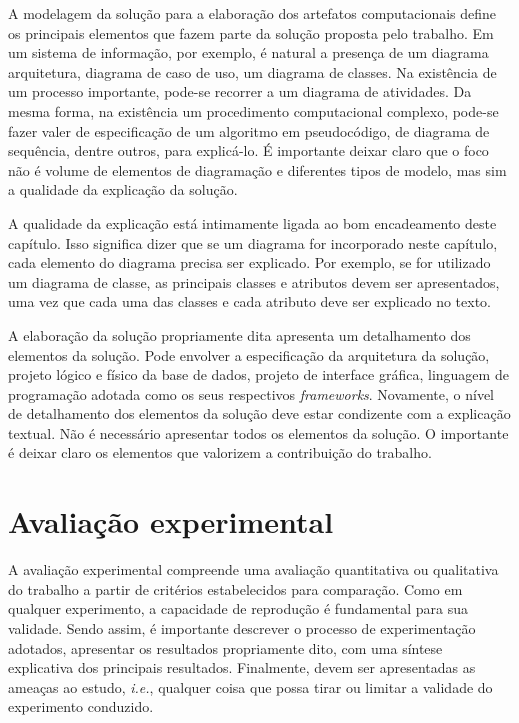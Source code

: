 \documentclass[12pt]{article}
\begin{document}
	A modelagem da solução para a elaboração dos artefatos computacionais define os principais elementos que fazem parte da solução proposta pelo trabalho. Em um sistema de informação, por exemplo, é natural a presença de um diagrama arquitetura, diagrama de caso de uso, um diagrama de classes. Na existência de um processo importante, pode-se recorrer a um diagrama de atividades. Da mesma forma, na existência um procedimento computacional complexo, pode-se fazer valer de especificação de um algoritmo em pseudocódigo, de diagrama de sequência, dentre outros, para explicá-lo. É importante deixar claro que o foco não é volume de elementos de diagramação e diferentes tipos de modelo, mas sim a qualidade da explicação da solução.
	
	A qualidade da explicação está intimamente ligada ao bom encadeamento deste capítulo. Isso significa dizer que se um diagrama for incorporado neste capítulo, cada elemento do diagrama precisa ser explicado. Por exemplo, se for utilizado um diagrama de classe, as principais classes e atributos devem ser apresentados, uma vez que cada uma das classes e cada atributo deve ser explicado no texto.
	
	A elaboração da solução propriamente dita apresenta um detalhamento dos elementos da solução. Pode envolver a especificação da arquitetura da solução, projeto lógico e físico da base de dados, projeto de interface gráfica, linguagem de programação adotada como os seus respectivos \emph{frameworks}. Novamente, o nível de detalhamento dos elementos da solução deve estar condizente com a explicação textual. Não é necessário apresentar todos os elementos da solução. O importante é deixar claro os elementos que valorizem a contribuição do trabalho.
	
	\section{Avaliação experimental}
	\label{sec_aval_exp}
	
	A avaliação experimental compreende uma avaliação quantitativa ou qualitativa do trabalho a partir de critérios estabelecidos para comparação. Como em qualquer experimento, a capacidade de reprodução é fundamental para sua validade. Sendo assim, é importante descrever o processo de experimentação adotados, apresentar os resultados propriamente dito, com uma síntese explicativa dos principais resultados. Finalmente, devem ser apresentadas as ameaças ao estudo, \emph{i.e.}, qualquer coisa que possa tirar ou limitar a validade do experimento conduzido. 
	
\end{document}
